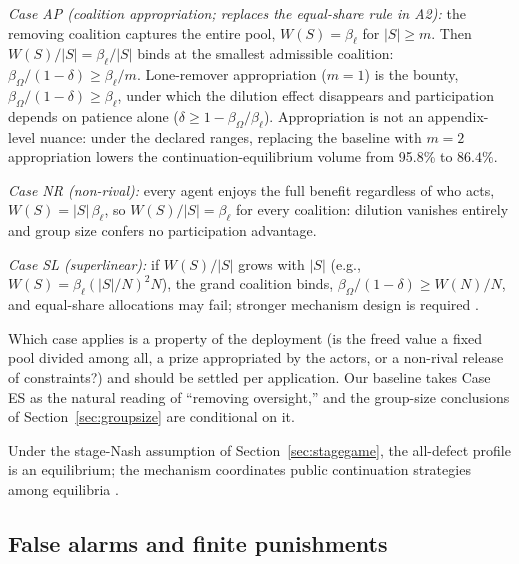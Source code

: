 \documentclass[manuscript,screen,review]{jair}
\newcommand{\VdynOverall}{95.8\%}      %
\begin{document}
\emph{Case AP (coalition appropriation; replaces the equal-share rule in A2):} the removing coalition captures the entire pool, $W(S) = \beta_\ell$ for $|S| \geq m$. Then $W(S)/|S| = \beta_\ell/|S|$ binds at the smallest admissible coalition: $\beta_\Omega/(1-\delta) \geq \beta_\ell/m$. Lone-remover appropriation ($m=1$) is the bounty, $\beta_\Omega/(1-\delta) \geq \beta_\ell$, under which the dilution effect disappears and participation depends on patience alone ($\delta \geq 1 - \beta_\Omega/\beta_\ell$). Appropriation is not an appendix-level nuance: under the declared ranges, replacing the baseline with $m=2$ appropriation lowers the continuation-equilibrium volume from \VdynOverall{} to $86.4\%$.

\emph{Case NR (non-rival):} every agent enjoys the full benefit regardless of who acts, $W(S) = |S|\,\beta_\ell$, so $W(S)/|S| = \beta_\ell$ for every coalition: dilution vanishes entirely and group size confers no participation advantage.

\emph{Case SL (superlinear):} if $W(S)/|S|$ grows with $|S|$ (e.g., $W(S) = \beta_\ell(|S|/N)^2 N$), the grand coalition binds, $\beta_\Omega/(1-\delta) \geq W(N)/N$, and equal-share allocations may fail; stronger mechanism design is required \cite{bernheim.peleg.whinston.1987}.

Which case applies is a property of the deployment (is the freed value a fixed pool divided among all, a prize appropriated by the actors, or a non-rival release of constraints?) and should be settled per application. Our baseline takes Case ES as the natural reading of ``removing oversight,'' and the group-size conclusions of Section~\ref{sec:groupsize} are conditional on it.

Under the stage-Nash assumption of Section~\ref{sec:stagegame}, the all-defect profile is an equilibrium; the mechanism coordinates public continuation strategies among equilibria \cite{aumann.1974,aumann.1987}.

\subsection{False alarms and finite punishments}
\label{app:false-alarms}
\end{document}
